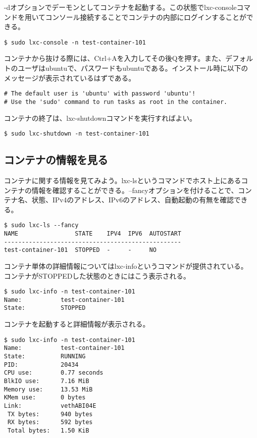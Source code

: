 \documentclass[9pt,b5paper,tombo]{jsbook}
\begin{document}
\noindent
-dオプションでデーモンとしてコンテナを起動する。この状態でlxc-consoleコマンドを用いてコンソール接続することでコンテナの内部にログインすることができる。

\begin{lstlisting}
$ sudo lxc-console -n test-container-101
\end{lstlisting}

\noindent
コンテナから抜ける際には、Ctrl+Aを入力してその後Qを押す。また、デフォルトのユーザはubuntuで、パスワードもubuntuである。インストール時に以下のメッセージが表示されているはずである。

\begin{lstlisting}
# The default user is 'ubuntu' with password 'ubuntu'!
# Use the 'sudo' command to run tasks as root in the container.
\end{lstlisting}

\noindent
コンテナの終了は、lxc-shutdownコマンドを実行すればよい。

\begin{lstlisting}
$ sudo lxc-shutdown -n test-container-101
\end{lstlisting}

\subsection{コンテナの情報を見る}
コンテナに関する情報を見てみよう。lxc-lsというコマンドでホスト上にあるコンテナの情報を確認することができる。--fancyオプションを付けることで、コンテナ名、状態、IPv4のアドレス、IPv6のアドレス、自動起動の有無を確認できる。

\begin{lstlisting}
$ sudo lxc-ls --fancy
NAME                STATE    IPV4  IPV6  AUTOSTART
--------------------------------------------------
test-container-101  STOPPED  -     -     NO
\end{lstlisting}

\noindent
コンテナ単体の詳細情報についてはlxc-infoというコマンドが提供されている。コンテナがSTOPPEDした状態のときにはこう表示される。

\begin{lstlisting}
$ sudo lxc-info -n test-container-101
Name:           test-container-101
State:          STOPPED
\end{lstlisting}

\noindent
コンテナを起動すると詳細情報が表示される。

\begin{lstlisting}
$ sudo lxc-info -n test-container-101
Name:           test-container-101
State:          RUNNING
PID:            20434
CPU use:        0.77 seconds
BlkIO use:      7.16 MiB
Memory use:     13.53 MiB
KMem use:       0 bytes
Link:           vethABI04E
 TX bytes:      940 bytes
 RX bytes:      592 bytes
 Total bytes:   1.50 KiB
\end{lstlisting}
\end{document}
